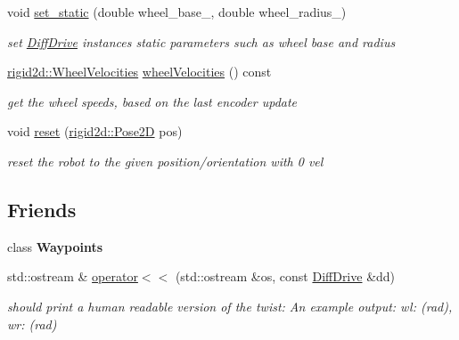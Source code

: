\begin{DoxyCompactItemize}
\mbox{\label{classrigid2d_1_1DiffDrive_aeef74e550d64bf34f599d78d2c74d964}} 
void \hyperlink{classrigid2d_1_1DiffDrive_aeef74e550d64bf34f599d78d2c74d964}{set\+\_\+static} (double wheel\+\_\+base\+\_\+, double wheel\+\_\+radius\+\_\+)
\begin{DoxyCompactList}\small\item\em set \hyperlink{classrigid2d_1_1DiffDrive}{Diff\+Drive} instance\textquotesingle{}s static parameters such as wheel base and radius \end{DoxyCompactList}\item 
\mbox{\label{classrigid2d_1_1DiffDrive_ab6fc216a849a565d176b6a4acad41b3f}} 
\hyperlink{structrigid2d_1_1WheelVelocities}{rigid2d\+::\+Wheel\+Velocities} \hyperlink{classrigid2d_1_1DiffDrive_ab6fc216a849a565d176b6a4acad41b3f}{wheel\+Velocities} () const
\begin{DoxyCompactList}\small\item\em get the wheel speeds, based on the last encoder update \end{DoxyCompactList}\item 
\mbox{\label{classrigid2d_1_1DiffDrive_a591ad10bd8dba675c9f5f929d2be6a74}} 
void \hyperlink{classrigid2d_1_1DiffDrive_a591ad10bd8dba675c9f5f929d2be6a74}{reset} (\hyperlink{structrigid2d_1_1Pose2D}{rigid2d\+::\+Pose2D} pos)
\begin{DoxyCompactList}\small\item\em reset the robot to the given position/orientation with 0 vel \end{DoxyCompactList}\end{DoxyCompactItemize}
\subsection*{Friends}
\begin{DoxyCompactItemize}
\item 
\mbox{\label{classrigid2d_1_1DiffDrive_afeca09cf85f3491b24cdc9f9d41bab3d}} 
class {\bfseries Waypoints}
\item 
std\+::ostream \& \hyperlink{classrigid2d_1_1DiffDrive_a550d9cd3c290f20ebcbc118c1dd79897}{operator$<$$<$} (std\+::ostream \&os, const \hyperlink{classrigid2d_1_1DiffDrive}{Diff\+Drive} \&dd)
\begin{DoxyCompactList}\small\item\em should print a human readable version of the twist\+: An example output\+: wl\+: (rad), wr\+: (rad) \end{DoxyCompactList}\end{DoxyCompactItemize}


